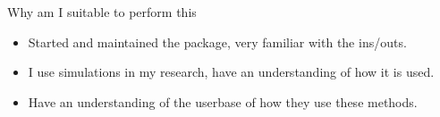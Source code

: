 \documentclass{beamer}
\begin{document}
\begin{frame}{Why am I suitable to perform this}
	\begin{itemize}
		\item Started and maintained the package, very familiar with the ins/outs.
		\item I use simulations in my research, have an understanding of how it is used.
		\item Have an understanding of the userbase of how they use these methods.
	\end{itemize}
\end{frame}
\end{document}
